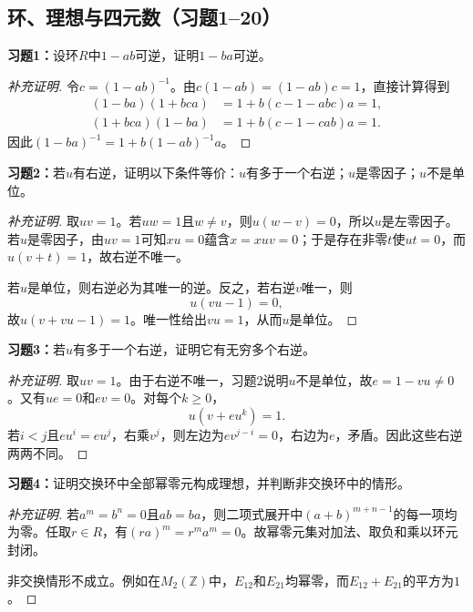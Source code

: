 
\subsection*{环、理想与四元数（习题1--20）}

\begin{problem}
\textbf{习题1：}设环$R$中$1-ab$可逆，证明$1-ba$可逆。
\end{problem}
\begin{proof}[补充证明]
令$c=(1-ab)^{-1}$。由$c(1-ab)=(1-ab)c=1$，直接计算得到
\begin{align*}
(1-ba)(1+bca)&=1+b(c-1-abc)a=1,\\
(1+bca)(1-ba)&=1+b(c-1-cab)a=1.
\end{align*}
因此$(1-ba)^{-1}=1+b(1-ab)^{-1}a$。
\end{proof}

\begin{problem}
\textbf{习题2：}若$u$有右逆，证明以下条件等价：$u$有多于一个右逆；$u$是零因子；$u$不是单位。
\end{problem}
\begin{proof}[补充证明]
取$uv=1$。若$uw=1$且$w\ne v$，则$u(w-v)=0$，所以$u$是左零因子。若$u$是零因子，由$uv=1$可知$xu=0$蕴含$x=xuv=0$；于是存在非零$t$使$ut=0$，而$u(v+t)=1$，故右逆不唯一。

若$u$是单位，则右逆必为其唯一的逆。反之，若右逆$v$唯一，则
\[
u(vu-1)=0,
\]
故$u(v+vu-1)=1$。唯一性给出$vu=1$，从而$u$是单位。
\end{proof}

\begin{problem}
\textbf{习题3：}若$u$有多于一个右逆，证明它有无穷多个右逆。
\end{problem}
\begin{proof}[补充证明]
取$uv=1$。由于右逆不唯一，习题2说明$u$不是单位，故$e=1-vu\ne0$。又有$ue=0$和$ev=0$。对每个$k\geqslant0$，
\[
u(v+eu^k)=1.
\]
若$i<j$且$eu^i=eu^j$，右乘$v^j$，则左边为$ev^{j-i}=0$，右边为$e$，矛盾。因此这些右逆两两不同。
\end{proof}

\begin{problem}
\textbf{习题4：}证明交换环中全部幂零元构成理想，并判断非交换环中的情形。
\end{problem}
\begin{proof}[补充证明]
若$a^m=b^n=0$且$ab=ba$，则二项式展开中$(a+b)^{m+n-1}$的每一项均为零。任取$r\in R$，有$(ra)^m=r^ma^m=0$。故幂零元集对加法、取负和乘以环元封闭。

非交换情形不成立。例如在$M_2(\mathbb Z)$中，$E_{12}$和$E_{21}$均幂零，而$E_{12}+E_{21}$的平方为$1$。
\end{proof}

